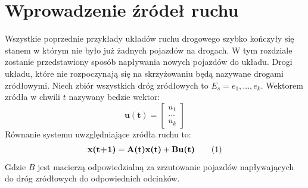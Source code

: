 \documentclass[12pt]{book}
\theoremstyle{plain}
\newcommand\addtag{\refstepcounter{equation}
\renewcommand{\labelenumii}{\theenumii}
\renewcommand{\theenumii}{\theenumi.\arabic{enumii}.}
\tag{\theequation}}
\begin{document}
\section{Wprowadzenie źródeł ruchu }
Wszystkie poprzednie przykłady układów ruchu drogowego szybko kończyły się stanem w którym nie było już żadnych pojazdów na drogach. W tym rozdziale zostanie przedstawiony sposób napływania nowych pojazdów do układu. Drogi układu, które nie rozpoczynają się na skrzyżowaniu będą nazywane drogami zródłowymi. Niech zbiór wszystkich dróg zródłowych to $E_s={e_1,...,e_k}$. Wektorem zródła w chwili $t$ nazywany bedzie wektor:
\[\boldsymbol{u(t)}=\begin{bmatrix} u_1 \\ ... \\ u_k \end{bmatrix} \]
Równanie systemu uwzględniające zródła ruchu to:
\[\textbf{x(t+1)}=\textbf{A(t)x(t)} + \textbf{Bu(t)} \label{eq:stan_u}   \addtag{}\]
Gdzie $B$ jest macierzą odpowiedzialną za zrzutowanie pojazdów napływających do dróg zródłowych do odpowiednich odcinków.
\end{document}
